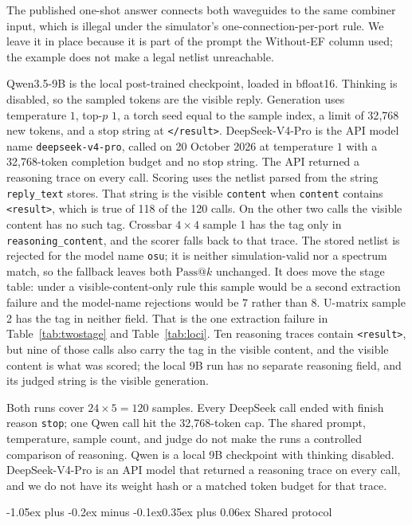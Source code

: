 \documentclass[11pt]{article}
\makeatletter
\renewcommand\subsection{\@startsection{subsection}{2}{\z@}%
  {-1.05ex plus -0.2ex minus -0.1ex}{0.35ex plus 0.06ex}%
  {\normalfont\normalsize\bfseries}}
\newcommand{\passk}[1]{\mathrm{Pass@}#1}
\makeatother
\begin{document}
The published one-shot answer connects both waveguides to the same combiner input, which is illegal under the simulator's one-connection-per-port rule.
We leave it in place because it is part of the prompt the Without-EF column used; the example does not make a legal netlist unreachable.

Qwen3.5-9B is the local post-trained checkpoint, loaded in bfloat16.
Thinking is disabled, so the sampled tokens are the visible reply.
Generation uses temperature $1$, top-$p$ $1$, a torch seed equal to the sample index, a limit of 32{,}768 new tokens, and a stop string at \texttt{\textless /result\textgreater}.
DeepSeek-V4-Pro is the API model name \texttt{deepseek-v4-pro}, called on 20 October 2026 at temperature $1$ with a 32{,}768-token completion budget and no stop string.
The API returned a reasoning trace on every call.
Scoring uses the netlist parsed from the string \texttt{reply\_text} stores.
That string is the visible \texttt{content} when \texttt{content} contains \texttt{\textless result\textgreater}, which is true of 118 of the 120 calls.
On the other two calls the visible content has no such tag.
Crossbar $4\times4$ sample 1 has the tag only in \texttt{reasoning\_content}, and the scorer falls back to that trace.
The stored netlist is rejected for the model name \texttt{osu}; it is neither simulation-valid nor a spectrum match, so the fallback leaves both $\passk{k}$ unchanged.
It does move the stage table: under a visible-content-only rule this sample would be a second extraction failure and the model-name rejections would be 7 rather than 8.
U-matrix sample 2 has the tag in neither field.
That is the one extraction failure in Table~\ref{tab:twostage} and Table~\ref{tab:loci}.
Ten reasoning traces contain \texttt{\textless result\textgreater}, but nine of those calls also carry the tag in the visible content, and the visible content is what was scored; the local 9B run has no separate reasoning field, and its judged string is the visible generation.

Both runs cover $24 \times 5 = 120$ samples.
Every DeepSeek call ended with finish reason \texttt{stop}; one Qwen call hit the 32{,}768-token cap.
The shared prompt, temperature, sample count, and judge do not make the runs a controlled comparison of reasoning.
Qwen is a local 9B checkpoint with thinking disabled.
DeepSeek-V4-Pro is an API model that returned a reasoning trace on every call, and we do not have its weight hash or a matched token budget for that trace.

\subsection{Shared protocol}
\end{document}

